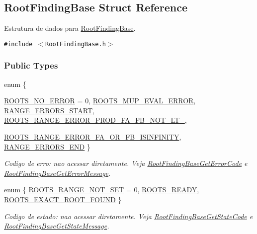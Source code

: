 \hypertarget{structRootFindingBase}{
\subsection{RootFindingBase Struct Reference}
\label{structRootFindingBase}
}
Estrutura de dados para \hyperlink{structRootFindingBase}{RootFindingBase}.  


{\tt \#include $<$RootFindingBase.h$>$}

\subsubsection*{Public Types}
\begin{CompactItemize}
\item 
enum \{ \par
\hyperlink{structRootFindingBase_63c3383c7a423657e53c74135d7fcc1ae0a49ccd8f86d5ba660590eae672a0a1}{ROOTS\_\-NO\_\-ERROR} =  0, 
\hyperlink{structRootFindingBase_63c3383c7a423657e53c74135d7fcc1a10b44efaa5251542d233614ba384561e}{ROOTS\_\-MUP\_\-EVAL\_\-ERROR}, 
\hyperlink{structRootFindingBase_63c3383c7a423657e53c74135d7fcc1ad98fe152da7c104c998d99f6a3799f9e}{RANGE\_\-ERRORS\_\-START}, 
\hyperlink{structRootFindingBase_63c3383c7a423657e53c74135d7fcc1ab0d840d6f480a358b7628ec252ade964}{ROOTS\_\-RANGE\_\-ERROR\_\-PROD\_\-FA\_\-FB\_\-NOT\_\-LT\_}, 
\par
\hyperlink{structRootFindingBase_63c3383c7a423657e53c74135d7fcc1a9b12d4346a0a0e6a2770fa91ebbb2095}{ROOTS\_\-RANGE\_\-ERROR\_\-FA\_\-OR\_\-FB\_\-ISINFINITY}, 
\hyperlink{structRootFindingBase_63c3383c7a423657e53c74135d7fcc1aa0557e4a6d95a4ba4414dea6967caebd}{RANGE\_\-ERRORS\_\-END}
 \}
\begin{CompactList}\small\item\em Codigo de erro: nao acessar diretamente. Veja \hyperlink{group____roots_gbcf354e731e02c63652af3a2058e739d}{RootFindingBaseGetErrorCode} e \hyperlink{group____roots_gcc5a0a8948e4b02a878f8d534c0bc982}{RootFindingBaseGetErrorMessage}. \item\end{CompactList}\item 
enum \{ \hyperlink{structRootFindingBase_4b7656f2b255891252a8139d4e31d5cbac10c8228ba8207380fb90936d0371e4}{ROOTS\_\-RANGE\_\-NOT\_\-SET} =  0, 
\hyperlink{structRootFindingBase_4b7656f2b255891252a8139d4e31d5cb252d7f65cbfc99cbdf016eeb55ded073}{ROOTS\_\-READY}, 
\hyperlink{structRootFindingBase_4b7656f2b255891252a8139d4e31d5cb186b76e2c569fc28eef4c744c7254a72}{ROOTS\_\-EXACT\_\-ROOT\_\-FOUND}
 \}
\begin{CompactList}\small\item\em Codigo de estado: nao acessar diretamente. Veja \hyperlink{group____roots_g1712b9a29b6e6b15df2195319d5f5d70}{RootFindingBaseGetStateCode} e \hyperlink{group____roots_ga2434bfeb9592ff54df8601cd1a9a04d}{RootFindingBaseGetStateMessage}. \item\end{CompactList}\end{CompactItemize}
